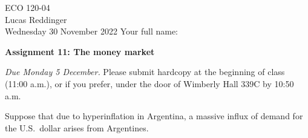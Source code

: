 \documentclass[
    letterpaper,paper=portrait,fleqn,
    DIV=16,fontsize=12pt,twoside=semi,
    parskip=full-,
    headings=standardclasses]
{scrartcl}
\begin{document}
\RaggedRight
\thispagestyle{plain}

ECO 120-04 \\
Lucas Reddinger \\
Wednesday 30 November 2022 \hfill Your full name: \underline{\hspace{3.25in}}

\vspace{0.7\baselineskip}
\textbf{\LARGE Assignment 11: The money market}
\vspace{0.3\baselineskip}

\emph{Due Monday 5 December.} Please submit hardcopy at the beginning of class (11:00 a.m.), or if you prefer, under the door of Wimberly Hall 339C by 10:50 a.m.

{\centering

\vspace{-0.5\baselineskip}
\vspace{-0.5\baselineskip}

}

Suppose that due to hyperinflation in Argentina, a massive influx of demand for the U.S.~dollar arises from Argentines.
\end{document}
